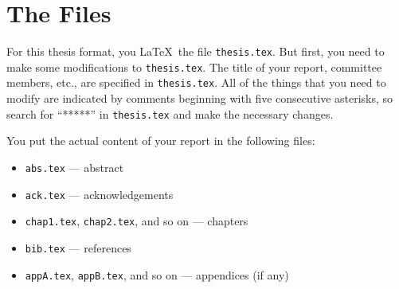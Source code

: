 \chapter{The Files}

For this thesis
format, you \LaTeX\ the file {\tt thesis.tex}. 
But first, you
need to make some modifications to {\tt thesis.tex}.
The title of your report, committee members, etc.,
are specified in {\tt thesis.tex}. All of the things that
you need to modify are indicated by comments beginning with five consecutive asterisks, 
so search for ``*****'' in {\tt thesis.tex} and make the necessary changes.

You put the actual content of your report 
in the following files:
\begin{itemize}
\item {\tt abs.tex} --- abstract
\item {\tt ack.tex} --- acknowledgements
\item {\tt chap1.tex}, {\tt chap2.tex}, and so on --- chapters
\item {\tt bib.tex} --- references
\item {\tt appA.tex}, {\tt appB.tex}, and so on --- appendices (if any)
\end{itemize}
